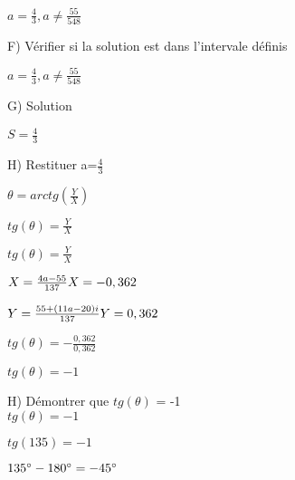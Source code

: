 $
a=\frac{4}{3}, a \neq \frac{55}{548}
$
\vspace{10mm} %

F) Vérifier si la solution est dans l'intervale définis \\
\vspace{2mm} %

$
a=\frac{4}{3}, a \neq \frac{55}{548}
$
\vspace{5mm} %


G) Solution \\
\vspace{2mm} %

$
S = \frac{4}{3}
$
\vspace{5mm} %


H) Restituer a=$\frac{4}{3}$ \\
\vspace{2mm} %

$
\theta = arctg(\frac{Y}{X})
$
\vspace{5mm} %

$
tg(\theta) = \frac{Y}{X}
$
\vspace{5mm} %


$
tg(\theta) = \frac{Y}{X}
$
\vspace{5mm} %

$
X = \frac{4a-55}{137}\\
X = -0,362
$
\vspace{5mm} %

$
Y= \frac{55+(11a-20)i}{137}\\
Y= 0,362
$
\vspace{5mm} %

$
tg(\theta) = - \frac{0,362}{0,362}
$
\vspace{5mm} %

$
tg(\theta) = -1
$
\vspace{5mm} %

H) Démontrer que $tg(\theta)$ = -1 \\

$
tg(\theta) = -1
$
\vspace{5mm} %

$
tg(135) = -1
$
\vspace{5mm} %

$
135^{\circ} -180^{\circ} = -45^{\circ} \\
$
\vspace{5mm} %

